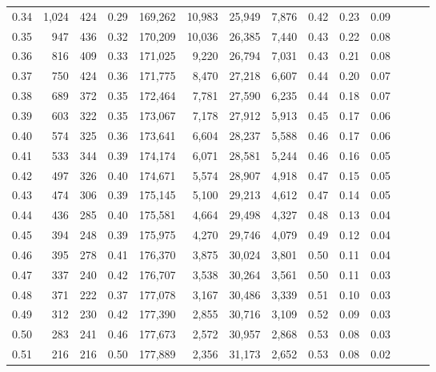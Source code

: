 \begin{tabular}{rrrrrrrrrrrrrr}
0.34 &   1,024 &    424 &  0.29 &  169,262 &   10,983 &  25,949 &   7,876 &  0.42 &  0.23 &      0.09 \\
0.35 &     947 &    436 &  0.32 &  170,209 &   10,036 &  26,385 &   7,440 &  0.43 &  0.22 &      0.08 \\
0.36 &     816 &    409 &  0.33 &  171,025 &    9,220 &  26,794 &   7,031 &  0.43 &  0.21 &      0.08 \\
0.37 &     750 &    424 &  0.36 &  171,775 &    8,470 &  27,218 &   6,607 &  0.44 &  0.20 &      0.07 \\
0.38 &     689 &    372 &  0.35 &  172,464 &    7,781 &  27,590 &   6,235 &  0.44 &  0.18 &      0.07 \\
0.39 &     603 &    322 &  0.35 &  173,067 &    7,178 &  27,912 &   5,913 &  0.45 &  0.17 &      0.06 \\
0.40 &     574 &    325 &  0.36 &  173,641 &    6,604 &  28,237 &   5,588 &  0.46 &  0.17 &      0.06 \\
0.41 &     533 &    344 &  0.39 &  174,174 &    6,071 &  28,581 &   5,244 &  0.46 &  0.16 &      0.05 \\
0.42 &     497 &    326 &  0.40 &  174,671 &    5,574 &  28,907 &   4,918 &  0.47 &  0.15 &      0.05 \\
0.43 &     474 &    306 &  0.39 &  175,145 &    5,100 &  29,213 &   4,612 &  0.47 &  0.14 &      0.05 \\
0.44 &     436 &    285 &  0.40 &  175,581 &    4,664 &  29,498 &   4,327 &  0.48 &  0.13 &      0.04 \\
0.45 &     394 &    248 &  0.39 &  175,975 &    4,270 &  29,746 &   4,079 &  0.49 &  0.12 &      0.04 \\
0.46 &     395 &    278 &  0.41 &  176,370 &    3,875 &  30,024 &   3,801 &  0.50 &  0.11 &      0.04 \\
0.47 &     337 &    240 &  0.42 &  176,707 &    3,538 &  30,264 &   3,561 &  0.50 &  0.11 &      0.03 \\
0.48 &     371 &    222 &  0.37 &  177,078 &    3,167 &  30,486 &   3,339 &  0.51 &  0.10 &      0.03 \\
0.49 &     312 &    230 &  0.42 &  177,390 &    2,855 &  30,716 &   3,109 &  0.52 &  0.09 &      0.03 \\
0.50 &     283 &    241 &  0.46 &  177,673 &    2,572 &  30,957 &   2,868 &  0.53 &  0.08 &      0.03 \\
0.51 &     216 &    216 &  0.50 &  177,889 &    2,356 &  31,173 &   2,652 &  0.53 &  0.08 &      0.02 \\

\end{tabular}
